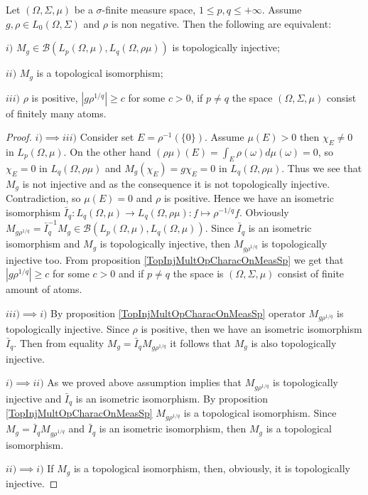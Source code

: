 \begin{proposition}\label{TopInjMultOpCharacBtwnTwoContMeasSp} Let $(\Omega,\Sigma,\mu)$ be a $\sigma$-finite measure space, $1\leq p,q\leq+\infty$. Assume $g,\rho\in L_0(\Omega,\Sigma)$ and $\rho$ is non negative. Then the following are equivalent:

$i)$ $M_g\in\mathcal{B}(L_p(\Omega,\mu),L_q(\Omega,\rho\mu))$ is topologically injective;

$ii)$ $M_g$ is a topological isomorphism;

$iii)$ $\rho$ is  positive, $|g \rho^{1/q}|\geq c$ for some $c>0$, if $p\neq q$ the space $(\Omega,\Sigma,\mu)$ consist of finitely many atoms.
\end{proposition}
\begin{proof} $i)$$\implies$$ iii)$ Consider set $E=\rho^{-1}(\{0\})$. Assume $\mu(E)>0$ then $\chi_E\neq 0$ in $L_p(\Omega,\mu)$. On the other hand $(\rho\mu)(E)=\int_E\rho(\omega)d\mu(\omega)=0$, so $\chi_E=0$ in $L_q(\Omega,\rho\mu)$ and $M_g(\chi_E)=g\chi_E=0$ in $L_q(\Omega,\rho \mu)$. Thus we see that $M_g$ is not injective and as the consequence it is not topologically injective. Contradiction, so $\mu(E)=0$ and $\rho$ is  positive. Hence we have an isometric isomorphism $\bar{I}_q:L_q(\Omega,\mu)\to L_q(\Omega,\rho\mu):f\mapsto \rho^{-1/q} f$. Obviously $M_{g\rho^{1/q}}=\bar{I}_q^{-1} M_g\in\mathcal{B}(L_p(\Omega,\mu),L_q(\Omega,\mu))$. Since $\bar{I}_q$ is an isometric isomorphism and $M_g$ is topologically injective, then $M_{g \rho^{1/q}}$ is topologically injective too. From proposition \ref{TopInjMultOpCharacOnMeasSp} we get that $|g\rho^{1/q}|\geq c$ for some $c>0$ and if $p\neq q$ the space is $(\Omega,\Sigma,\mu)$ consist of finite amount of atoms.

$iii)$$\implies$$ i)$ By proposition \ref{TopInjMultOpCharacOnMeasSp} operator $M_{g \rho^{1/q}}$ is topologically injective. Since $\rho$ is positive, then  
we have an isometric isomorphism $\bar{I}_q$. Then from equality $M_g=\bar{I}_q M_{g \rho^{1/q}}$ it follows that $M_g$ is also topologically injective.

$i)$$\implies$$ ii)$ As we proved above assumption implies that $M_{g \rho^{1/q}}$ is topologically injective and $\bar{I}_q$ is an isometric isomorphism. By proposition \ref{TopInjMultOpCharacOnMeasSp} $M_{g \rho^{1/q}}$ is a topological isomorphism. Since $M_g=\bar{I}_q M_{g \rho^{1/q}}$ and $\bar{I}_q$ is an isometric isomorphism, then $M_g$ is a topological isomorphism.

$ii)$$\implies$$ i)$ If $M_g$ is a topological isomorphism, then, obviously, it is topologically injective.
\end{proof}
